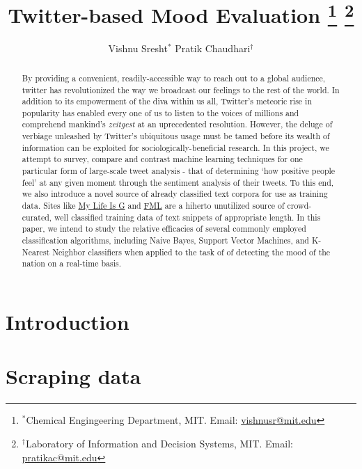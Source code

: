 \documentclass[10pt, letterpaper, conference, final, twocolumn]{ieeeconf}
\begin{document}
\title{\bf Twitter-based Mood Evaluation
	\thanks{$^*$Chemical Engingeering Department, MIT. Email: \href{mailto:vishnusr@mit.edu}{vishnusr@mit.edu}}
	\thanks{$^\dag$Laboratory of Information and Decision Systems, MIT. Email: \href{mailto:pratikac@mit.edu}{pratikac@mit.edu}}
}
\author{Vishnu Sresht$^*$ \qquad Pratik Chaudhari$^\dag$}
\maketitle

\begin{abstract}
By providing a convenient, readily-accessible way to reach out to a global audience, twitter has revolutionized the way we broadcast our feelings to the rest of the world. In addition to its empowerment of the diva within us all, Twitter's meteoric rise in popularity has enabled every one of us to listen to the voices of millions and comprehend mankind's \textit{zeitgest} at an uprecedented resolution. However, the deluge of verbiage unleashed by Twitter's ubiquitous usage must be tamed before its wealth of information can be exploited for sociologically-beneficial research. In this project, we attempt to survey, compare and contrast machine learning techniques for one particular form of large-scale tweet analysis - that of determining `how positive people feel' at any given moment through the sentiment analysis of their tweets. To this end, we also introduce a novel source of already classified text corpora for use as training data. Sites like \href{http://mylifeisg.com}{My Life Is G} and \href{http://fmylife.com}{FML} are a hiherto unutilized source of crowd-curated, well classified training data of text snippets of appropriate length. In this paper, we intend to study the relative efficacies of several commonly employed classification algorithms, including Naive Bayes, Support Vector Machines, and K-Nearest Neighbor classifiers when applied to the task of of detecting the mood of the nation on a real-time basis.
\end{abstract}

\section{Introduction}
\label{sec:intro}

\section{Scraping data}
\label{sec:data}
\end{document}

